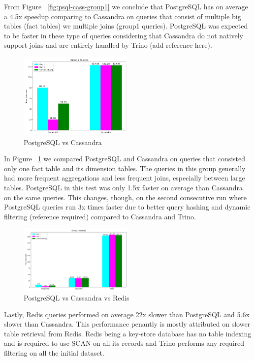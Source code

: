 \documentclass[conference]{IEEEtran}
\begin{document}
From Figure ~\ref{fig:psql-cass-group1} we conclude that PostgreSQL has on average a 4.5x speedup comparing to Cassandra on queries that consist of multiple big tables (fact tables) we multiple joins (group1 queries). PostgreSQL was expected to be faster in these type of queries considering that Cassandra do not natively support joins and are entirely handled by Trino (add reference here).

\begin{figure}[h]
	\centering
	\includegraphics[width=0.5\textwidth]{images/DBs_bench_no_distro/group2.png}
	\caption{PostgreSQL vs Cassandra}
	\label{fig:psql-cass-group2}
\end{figure}

In Figure ~\ref{fig:psql-cass-group2} we compared PostgreSQL and Cassandra on queries that consisted only one fact table and its dimension tables. The queries in this group generally had more frequent aggregations and less frequent joins, especially between large tables. PostgreSQL in this test was only 1.5x faster on average than Cassandra on the same queries. This changes, though, on the second consecutive run where PostgreSQL queries run 3x times faster due to better query hashing and dynamic filtering (reference required) compared to Cassandra and Trino.

\begin{figure}[h]
	\centering
	\includegraphics[width=0.5\textwidth]{images/DBs_bench_no_distro/group3.png}
	\caption{PostgreSQL vs Cassandra vs Redis}
	\label{fig:store_sales_er_diagram}
\end{figure}

Lastly, Redis queries performed on average 22x slower than PostgreSQL and 5.6x slower than Cassandra. This performance penantly is mostly attributed on slower table retrieval from Redis. Redis being a key-store database has no table indexing and is required to use SCAN on all its records and Trino performs any required filtering on all the initial dataset.
\end{document}
